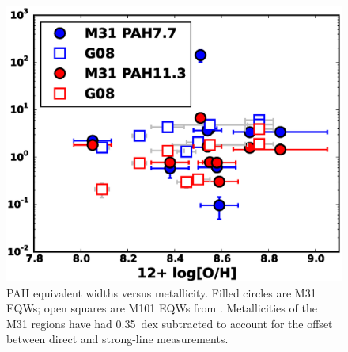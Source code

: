\begin{figure}
\centering
\includegraphics[scale=0.4]{./fig12a.eps}
\caption{ PAH equivalent widths versus metallicity. 
Filled circles are M31 EQWs;  open squares are M101 EQWs from \citet{Gordon:2008lr}.
Metallicities of the M31 regions have had 0.35~dex subtracted to account for the offset  between direct and strong-line measurements. 
}
\label{metalicityVseqw}
\end{figure}



